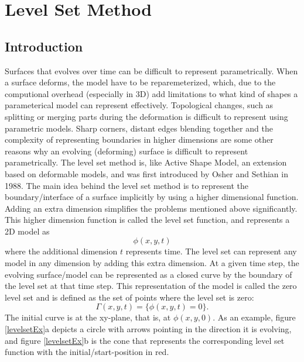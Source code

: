 \chapter{Level Set Method}
\label{levelSet}
\section{Introduction}
Surfaces that evolves over time can be difficult to represent parametrically. When a surface deforms, the model have to be reparemeterized, which, due to the computional overhead (especially in 3D) add limitations to what kind of shapes a parameterical model can represent effectively. Topological changes, such as splitting or merging parts during the deformation is difficult to represent using parametric models. Sharp corners, distant edges blending together and the complexity of representing boundaries in higher dimensions are some other reasons why an evolving (deforming) surface is difficult to represent parametrically. The level set method is, like Active Shape Model, an extension based on deformable models, and was first introduced by Osher and Sethian in 1988\cite{osher88}. The main idea behind the level set method is to represent the boundary/interface of a surface implicitly by using a higher dimensional function. Adding an extra dimension simplifies the problems mentioned above significantly. This higher dimension function is called the level set function, and represents a 2D model as
\begin{equation}
\phi(x, y, t) 
\end{equation}
where the additional dimension \(t\) represents time. The level set can represent any model in any dimension by adding this extra dimension. At a given time step, the evolving surface/model can be represented as a closed curve by the boundary of the level set at that time step. This representation of the model is called the zero level set and is defined as the set of points where the level set is zero:
\begin{equation}
\Gamma(x, y, t) = \{\phi(x, y, t) = 0\}. 
\end{equation}
The initial curve is at the xy-plane, that is, at \(\phi(x,y,0)\). As an example, figure \ref{levelsetEx}a depicts a circle with arrows pointing in the direction it is evolving, and figure \ref{levelsetEx}b is the cone that represents the corresponding level set function with the initial/start-position in red.

